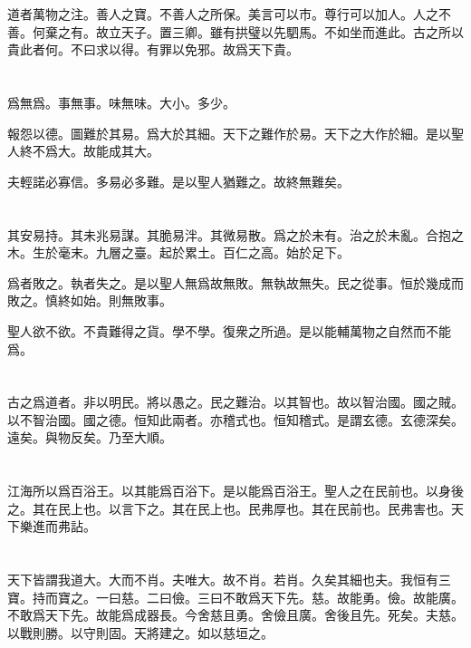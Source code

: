 \documentclass[a5paper]{ctexbook}
\begin{document}
    道者萬物之注。善人之寶。不善人之所保。美言可以市。尊行可以加人。人之不善。何棄之有。故立天子。置三卿。雖有拱璧以先駟馬。不如坐而進此。古之所以貴此者何。不曰求以得。有罪以免邪。故爲天下貴。

    \chapter{}

    爲無爲。事無事。味無味。大小。多少。
    
    報怨以德。圖難於其易。爲大於其細。天下之難作於易。天下之大作於細。是以聖人終不爲大。故能成其大。

    夫輕諾必寡信。多易必多難。是以聖人猶難之。故終無難矣。

    \chapter{}

    其安易持。其未兆易謀。其脆易泮。其微易散。爲之於未有。治之於未亂。合抱之木。生於毫末。九層之臺。起於累土。百仁之高。始於足下。

    爲者敗之。執者失之。是以聖人無爲故無敗。無執故無失。民之從事。恒於幾成而敗之。慎終如始。則無敗事。

    聖人欲不欲。不貴難得之貨。學不學。復衆之所過。是以能輔萬物之自然而不能爲。

    \chapter{}

    古之爲道者。非以明民。將以愚之。民之難治。以其智也。故以智治國。國之賊。以不智治國。國之德。恒知此兩者。亦稽式也。恒知稽式。是謂玄德。玄德深矣。遠矣。與物反矣。乃至大順。

    \chapter{}

    江海所以爲百浴王。以其能爲百浴下。是以能爲百浴王。聖人之在民前也。以身後之。其在民上也。以言下之。其在民上也。民弗厚也。其在民前也。民弗害也。天下樂進而弗詀。

    \chapter{}

    天下皆謂我道大。大而不肖。夫唯大。故不肖。若肖。久矣其細也夫。我恒有三寶。持而寶之。一曰慈。二曰儉。三曰不敢爲天下先。慈。故能勇。儉。故能廣。不敢爲天下先。故能爲成器長。今舍慈且勇。舍儉且廣。舍後且先。死矣。夫慈。以戰則勝。以守則固。天將建之。如以慈垣之。
\end{document}
